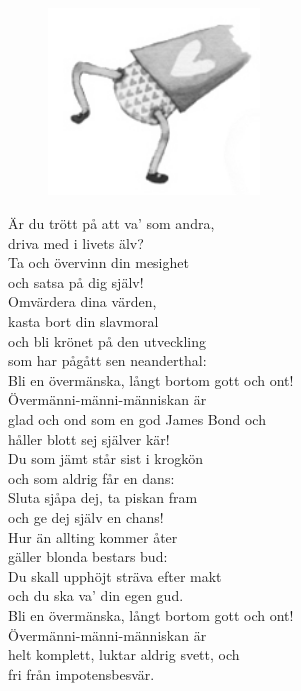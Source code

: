 \documentclass[a6paper, 10pt, twoside]{article}
\begin{document}
\vspace{35pt}
\begin{figure}[!h]
\centering
\includegraphics[width=0.5\textwidth]{lingonben.png}
\end{figure}

\begin{center}
\end{center}
\begin{lyrics}
\small Är du trött på att va' som andra,\\ 
driva med i livets älv?\\ 
Ta och övervinn din mesighet\\ 
och satsa på dig själv!
\vspace{5pt}\\ 
Omvärdera dina värden,\\ 
kasta bort din slavmoral\\ 
och bli krönet på den utveckling\\ 
som har pågått sen neanderthal:
 \vspace{5pt}\\ 
Bli en övermänska, långt bortom gott och ont!\\ 
Övermänni-männi-människan är\\ 
glad och ond som en god James Bond och\\ 
håller blott sej själver kär!
\vspace{5pt}\\  
Du som jämt står sist i krogkön\\ 
och som aldrig får en dans:\\ 
Sluta sjåpa dej, ta piskan fram\\ 
och ge dej själv en chans!
\vspace{5pt}\\  
Hur än allting kommer åter\\ 
gäller blonda bestars bud:\\ 
Du skall upphöjt sträva efter makt\\ 
och du ska va' din egen gud.
\vspace{5pt}\\  
Bli en övermänska, långt bortom gott och ont!\\ 
Övermänni-männi-människan är\\ 
helt komplett, luktar aldrig svett, och\\ 
fri från impotensbesvär.
\end{lyrics}
\end{document}
